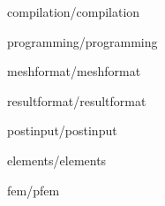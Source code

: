 \documentclass[a4paper,english]{report}    %
\newcommand{\Include}{}
\begin{document}
\begin{versiona}


\graphicspath{{./}{compilation/}}
\Include{compilation/compilation}

\graphicspath{{./}{programming/}}
\Include{programming/programming}



\appendix


\graphicspath{{./}{meshformat/}}
\Include{meshformat/meshformat}

\graphicspath{{./}{resultformat/}}
\Include{resultformat/resultformat}

\graphicspath{{./}{postinput/}}
\Include{postinput/postinput}

\graphicspath{{./}{elements/}}
\Include{elements/elements}

\graphicspath{{./}{fem/}}
\Include{fem/pfem}

\end{versiona}




%
%


\printindex

\end{document}
